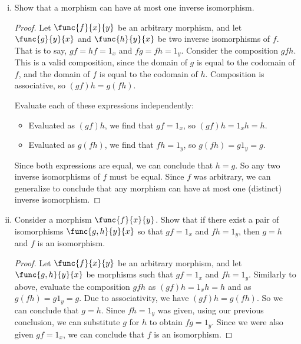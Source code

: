 \documentclass[main.tex]{subfiles}
\begin{document}
\begin{exercise}\leavevmode
	\begin{enumerate}[(i)]
		\item Show that a morphism can have at most one inverse isomorphism.
			\begin{proof}
				Let \(\func{f}{x}{y}\) be an arbitrary morphism, and let
				\(\func{g}{y}{x}\) and \(\func{h}{y}{x}\) be two inverse
				isomorphisms of \(f\). That is to say, \(gf=hf=1_{x}\) and
				\(fg=fh=1_{y}\). Consider the composition \(gfh\). This is a
				valid composition, since the domain of \(g\) is equal to the
				codomain of \(f\), and the domain of \(f\) is equal to the
				codomain of \(h\). Composition is associative, so \((gf)h =
				g(fh)\).

				Evaluate each of these expressions independently:
				\begin{itemize}
					\item Evaluated as \((gf)h\), we find that \(gf=1_{x}\), so
						\((gf)h=1_{x}h=h\).
					\item Evaluated as \(g(fh)\), we find that \(fh=1_{y}\), so
						\(g(fh)=g1_{y}=g\).
				\end{itemize}

				Since both expressions are equal, we can conclude that \(h=g\).
				So any two inverse isomorphisms of \(f\) must be equal. Since
				\(f\) was arbitrary, we can generalize to conclude that any
				morphism can have at most one (distinct) inverse isomorphism.
			\end{proof}

		\item Consider a morphism \(\func{f}{x}{y}\). Show that if there exist a
			pair of isomorphisms \(\func{g,h}{y}{x}\) so that \(gf=1_{x}\) and
			\(fh=1_{y}\), then \(g=h\) and \(f\) is an isomorphism.\\
			\begin{proof}
				Let \(\func{f}{x}{y}\) be an arbitrary morphism, and let
				\(\func{g,h}{y}{x}\) be morphisms such that \(gf=1_{x}\) and
				\(fh=1_{y}\). Similarly to above, evaluate the composition
				\(gfh\) as \((gf)h=1_{x}h=h\) and as \(g(fh)=g1_{y}=g\). Due to
				associativity, we have \((gf)h=g(fh)\). So we can conclude that \(g=h\).
				Since \(fh=1_{y}\) was given, using our previous conclusion, we can
				substitute \(g\) for \(h\) to obtain \(fg=1_{y}\). Since we were
				also given \(gf=1_{x}\), we can conclude that \(f\) is an
				isomorphism.
			\end{proof}
	\end{enumerate}
\end{exercise}
\end{document}
